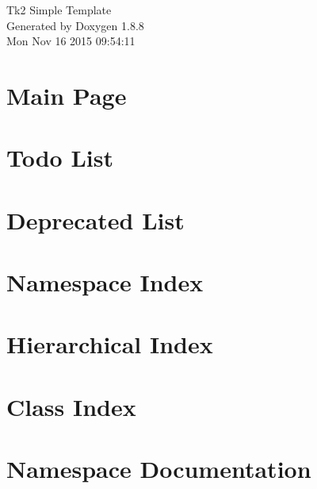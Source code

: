 \documentclass[twoside]{book}
\newcommand{\+}{\discretionary{\mbox{\scriptsize$\hookleftarrow$}}{}{}}
\newcommand{\clearemptydoublepage}{%
  \newpage{\pagestyle{empty}\cleardoublepage}%
}
\begin{document}
\hypersetup{pageanchor=false,
             bookmarks=true,
             bookmarksnumbered=true,
             pdfencoding=unicode
            }
\begin{titlepage}
\vspace*{7cm}
\begin{center}%
{\Large Tk2 Simple Template }\\
\vspace*{1cm}
{\large Generated by Doxygen 1.8.8}\\
\vspace*{0.5cm}
{\small Mon Nov 16 2015 09:54:11}\\
\end{center}
\end{titlepage}
\clearemptydoublepage
\tableofcontents
\clearemptydoublepage
{}
\hypersetup{pageanchor=true}

\chapter{Main Page}
\label{index}\hypertarget{index}{}
\chapter{Todo List}
\label{todo}
\hypertarget{todo}{}

\chapter{Deprecated List}
\label{deprecated}
\hypertarget{deprecated}{}

\chapter{Namespace Index}

\chapter{Hierarchical Index}

\chapter{Class Index}

\chapter{Namespace Documentation}

\end{document}
